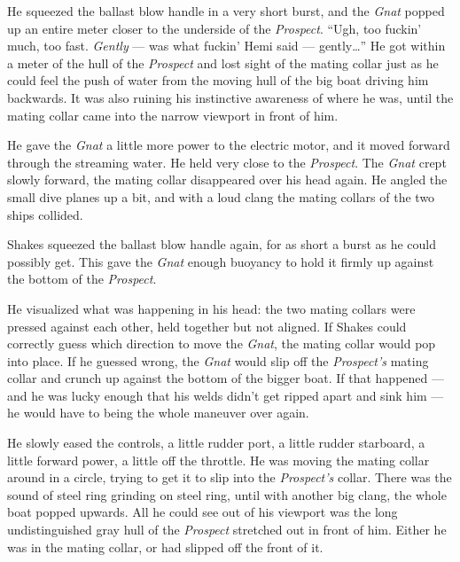 \documentclass[]{scrbook}
\begin{document}
He squeezed the ballast blow handle in a very short burst, and the
\emph{Gnat} popped up an entire meter closer to the underside of the
\emph{Prospect}. ``Ugh, too fuckin' much, too fast. \emph{Gently} ---
was what fuckin' Hemi said --- gently\ldots{}'' He got within a meter of
the hull of the \emph{Prospect} and lost sight of the mating collar just
as he could feel the push of water from the moving hull of the big boat
driving him backwards. It was also ruining his instinctive awareness of
where he was, until the mating collar came into the narrow viewport in
front of him.

He gave the \emph{Gnat} a little more power to the electric motor, and
it moved forward through the streaming water. He held very close to the
\emph{Prospect}. The \emph{Gnat} crept slowly forward, the mating collar
disappeared over his head again. He angled the small dive planes up a
bit, and with a loud clang the mating collars of the two ships collided.

Shakes squeezed the ballast blow handle again, for as short a burst as
he could possibly get. This gave the \emph{Gnat} enough buoyancy to hold
it firmly up against the bottom of the \emph{Prospect}.

He visualized what was happening in his head: the two mating collars
were pressed against each other, held together but not aligned. If
Shakes could correctly guess which direction to move the \emph{Gnat},
the mating collar would pop into place. If he guessed wrong, the
\emph{Gnat} would slip off the \emph{Prospect's} mating collar and
crunch up against the bottom of the bigger boat. If that happened ---
and he was lucky enough that his welds didn't get ripped apart and sink
him --- he would have to being the whole maneuver over again.

He slowly eased the controls, a little rudder port, a little rudder
starboard, a little forward power, a little off the throttle. He was
moving the mating collar around in a circle, trying to get it to slip
into the \emph{Prospect's} collar. There was the sound of steel ring
grinding on steel ring, until with another big clang, the whole boat
popped upwards. All he could see out of his viewport was the long
undistinguished gray hull of the \emph{Prospect} stretched out in front
of him. Either he was in the mating collar, or had slipped off the front
of it.
\end{document}
